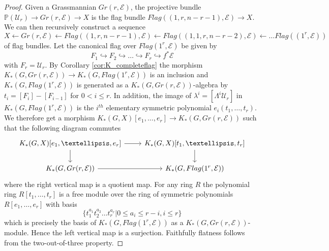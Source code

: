 \documentclass[11pt,twoside]{amsart}
\theoremstyle{definition}
\theoremstyle{remark}
\numberwithin{equation}{section}
\newcommand{\into}{\hookrightarrow}
\begin{document}
	\begin{proof}
		Given a Grassmannian $Gr(r,\mathcal{E})$, the projective bundle $\mathbb{P}(\mathcal{U}_r)\to Gr(r,\mathcal{E})\to X$ is the flag bundle $Flag((1,r,n-r-1),\mathcal{E})\to X$. We can then recursively construct a sequence 
		\[X\leftarrow Gr(r,\mathcal{E})\leftarrow Flag((1,r,n-r-1),\mathcal{E})\leftarrow Flag((1,1,r,n-r-2),\mathcal{E})\leftarrow\ldots Flag((1^r,\mathcal{E})) \]
		of flag bundles. Let the canonical flag over $Flag(1^r,\mathcal{E})$ be given by
		\[ F_1\into F_2\into\ldots\into F_r\into f^*\mathcal{E}\]
		 with $F_r=\mathcal{U}_r$. By Corollary \ref{cor:K_completeflag} the morphism $K_*(G,Gr(r,\mathcal{E}))\to K_*(G,Flag(1^r,\mathcal{E}))$ is an inclusion and $K_*(G,Flag(1^r,\mathcal{E}))$ is generated as a $K_*(G,Gr(r,\mathcal{E}))$-algebra by $t_i=[F_i]-[F_{i-1}]$ for $0<i\leq r$. In addition, the image of $\lambda^i=[\Lambda^i\mathcal{U}_r]$ in $K_*(G,Flag(1^r,\mathcal{E}))$ is the $i^{th}$ elementary symmetric polynomial $e_i(t_1,\ldots,t_r)$. We therefore get a morphism $K_*(G,X)[e_1,\ldots,e_r]\to K_*(G,Gr(r,\mathcal{E}))$ such that the following diagram commutes
		 \[      \begin{tikzcd}
		 		K_*(G, X)[e_1,\ldots,e_r]\arrow[r]\arrow[d] &K_*(G, X)[t_1,\ldots,t_r]\arrow[d]\\
		 		K_*(G,Gr(r,\mathcal{E}))\arrow[r] &K_*(G,Flag(1^r,\mathcal{E}))
		 		\end{tikzcd}
		 	\] 
		 	where the right vertical map is a quotient map. For any ring $R$ the polynomial ring $R[t_1,\ldots,t_r]$ is a free module over the ring of symmetric polynomials $R[e_1,\ldots,e_r]$ with basis 
		 	\[\{t_1^{a_1}t_2^{a_2}\ldots t_r^{a_r} |0\leq a_i\leq r-i, i\leq r  \}\]
		 	which is precisely the basis of $K_*(G,Flag(1^r,\mathcal{E}))$ as a $K_*(G, Gr(r,\mathcal{E}))$-module. Hence the left vertical map is a surjection. Faithfully flatness follows from the two-out-of-three property.
		\end{proof}
		
\end{document}
